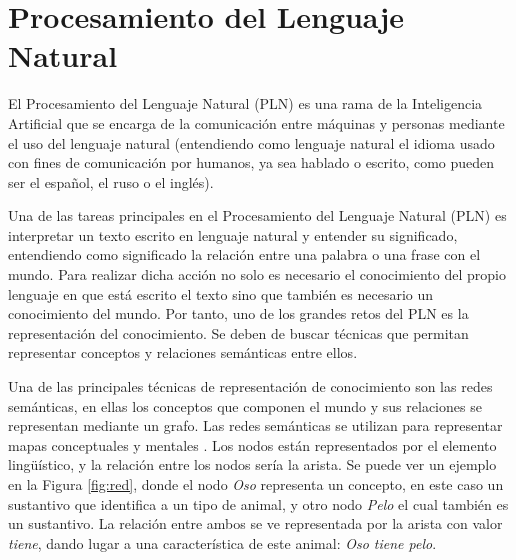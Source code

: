 \section{Procesamiento del Lenguaje Natural}
\label{cap:sec:lenguajenatural}
El Procesamiento del Lenguaje Natural (PLN) es una rama de la Inteligencia Artificial que se encarga de la comunicación entre máquinas y personas mediante el uso del lenguaje natural (entendiendo como lenguaje natural el idioma usado con fines de comunicación por humanos, ya sea hablado o escrito, como pueden ser el español, el ruso o el inglés). 

Una de las tareas principales en el Procesamiento del Lenguaje Natural (PLN) es interpretar un texto escrito en lenguaje natural y entender su significado, entendiendo como significado la relación entre una palabra o una frase con el mundo. Para realizar dicha acción no solo es necesario el conocimiento del propio lenguaje en que está escrito el texto sino que también es necesario un conocimiento del mundo. Por tanto, uno de los grandes retos del PLN es la representación del conocimiento. Se deben de buscar técnicas que permitan representar conceptos y relaciones semánticas entre ellos. 

Una de las principales técnicas de representación de conocimiento son las redes semánticas, en ellas los conceptos que componen el mundo y sus relaciones se representan mediante un grafo. Las redes semánticas se utilizan para representar mapas conceptuales y mentales \citep{redSemantica2018}.
Los nodos están representados por el elemento lingüístico, y la relación entre los nodos sería la arista. Se puede ver un ejemplo en la Figura \ref{fig:red}, donde el nodo \textit{Oso} representa un concepto, en este caso un sustantivo que identifica a un tipo de animal, y otro nodo \textit{Pelo} el cual también es un sustantivo. La relación entre ambos se ve representada por la arista con valor \textit{tiene}, dando lugar a una característica de este animal: \textit{Oso tiene pelo}.


